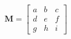 \documentclass[preview]{standalone}
\begin{document}
\begin{align*}
\mathbf{M} = \begin{bmatrix} a & b & c \\ d & e & f \\ g & h & i \end{bmatrix}
\end{align*}
\end{document}
